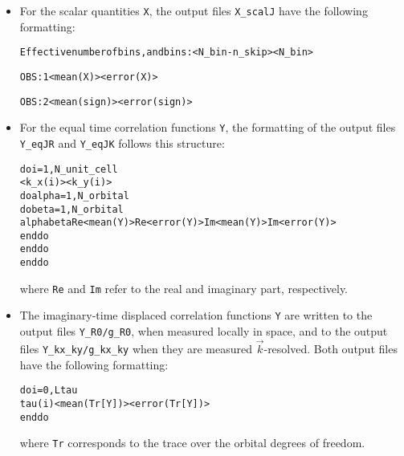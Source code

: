 \begin{itemize}
\item For the scalar quantities \texttt{X}, the output files  \texttt{X\_scalJ} have the following formatting:
\begin{alltt}
Effective number of bins, and bins:           <N_bin - n_skip>          <N_bin>

OBS :    1      <mean(X)>      <error(X)>

OBS :    2      <mean(sign)>   <error(sign)>
\end{alltt}

\item For the equal time correlation functions \texttt{Y}, the formatting of the output files \texttt{Y\_eqJR} and \texttt{Y\_eqJK} follows this structure:
\begin{alltt}
do i = 1, N_unit_cell
   <k_x(i)>   <k_y(i)>
   do alpha = 1, N_orbital
   do beta  = 1, N_orbital
      alpha   beta   Re<mean(Y)>   Re<error(Y)>   Im<mean(Y)>   Im<error(Y)>
   enddo
   enddo
enddo
\end{alltt}
where \texttt{Re} and \texttt{Im} refer to the real and imaginary part, respectively.

\item The imaginary-time displaced correlation functions \texttt{Y} are written to the output files \texttt{Y\_R0/g\_R0}, when measured locally in space, 
and to the output files \texttt{Y\_kx\_ky/g\_kx\_ky} when they are measured $\vec{k}$-resolved. 
Both output files have the following formatting:
\begin{alltt}
do i = 0, Ltau
   tau(i)   <mean( Tr[Y] )>   <error( Tr[Y])>
enddo
\end{alltt}
where \texttt{Tr} corresponds to the trace over the orbital degrees of freedom.

\end{itemize}
